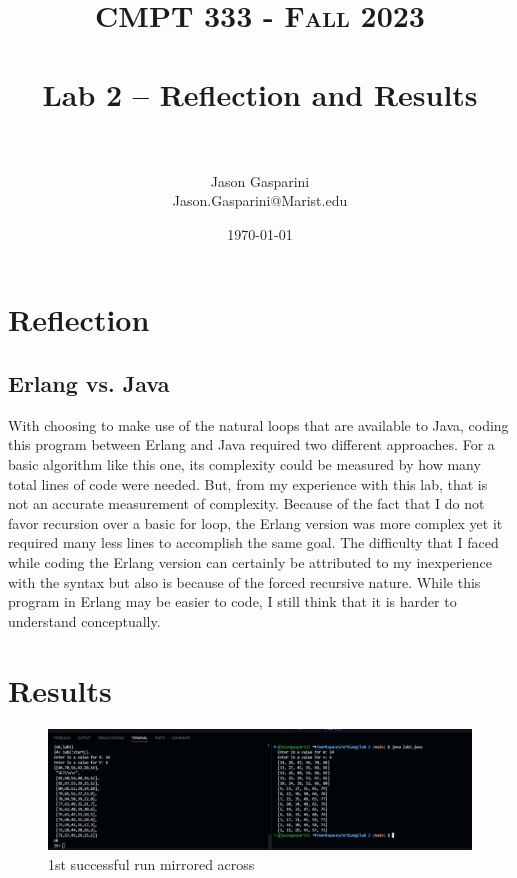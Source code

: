 \documentclass[letterpaper, 10pt]{article}
\title{	
   \normalfont \normalsize 
   \textsc{CMPT 333 - Fall 2023 } \\[10pt] %
   \horrule{0.5pt} \\[0.25cm] 	%
   \huge Lab 2 -- Reflection and Results \\     	    %
   \horrule{0.5pt} \\[0.25cm] 	%
}
\author{Jason Gasparini \\ \normalsize Jason.Gasparini@Marist.edu}
\date{\normalsize\today} 	%
\begin{document}
\maketitle %



\section{Reflection}
\vspace{1em}

\subsection{Erlang vs. Java}

With choosing to make use of the natural loops that are available to Java, coding this program between Erlang and Java required two different approaches. For a basic algorithm like this one, its complexity could be measured by how many total lines of code were needed. But, from my experience with this lab, that is not an accurate measurement of complexity. Because of the fact that I do not favor recursion over a basic for loop, the Erlang version was more complex yet it required many less lines to accomplish the same goal. The difficulty that I faced while coding the Erlang version can certainly be attributed to my inexperience with the syntax but also is because of the forced recursive nature. While this program in Erlang may be easier to code, I still think that it is harder to understand conceptually.

\vspace{2em}

\section{Results}

\begin{figure}
    \centering
    \includegraphics[width=\textwidth]{1.png}
    \caption{1st successful run mirrored across}
    \label{fig:1}
\end{figure}
\end{document}
